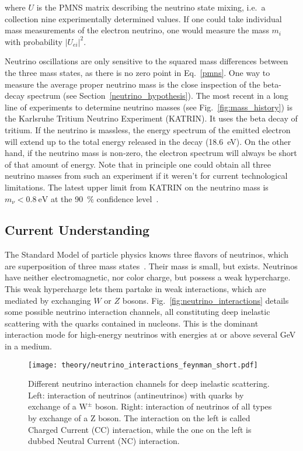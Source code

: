 where $U$ is the PMNS matrix describing the neutrino state mixing, i.e.\ a collection nine experimentally determined values. If one could take individual mass measurements of the electron neutrino, one would measure the mass $m_i$ with probability $|U_{ei}|^2$.

Neutrino oscillations are only sensitive to the squared mass differences between the three mass states, as there is no zero point in Eq.~\ref{pmns}. One way to measure the average proper neutrino mass is the close inspection of the beta-decay spectrum (see Section~\ref{neutrino_hypothesis}). The most recent in a long line of experiments to determine neutrino masses (see Fig.~\ref{fig:mass_history}) is the Karlsruhe Tritium Neutrino Experiment (KATRIN). It uses the beta decay of tritium. If the neutrino is massless, the energy spectrum of the emitted electron will extend up to the total energy released in the decay (\SI{18.6}{\eV}). On the other hand, if the neutrino mass is non-zero, the electron spectrum will always be short of that amount of energy. Note that in principle one could obtain all three neutrino masses from such an experiment if it weren't for current technological limitations. The latest upper limit from KATRIN on the neutrino mass is $m_\nu < \SI{0.8}{\eV}$ at the \SI{90}{\percent} confidence level~.


\subsection{Current Understanding}\label{neutrinos_current}
The Standard Model of particle physics knows three flavors of neutrinos, which are superposition of three mass states~. Their mass is small, but exists. Neutrinos have neither electromagnetic, nor color charge, but possess a weak hypercharge. This weak hypercharge lets them partake in weak interactions, which are mediated by exchanging $W$ or $Z$ bosons. Fig.~\ref{fig:neutrino_interactions} details some possible neutrino interaction channels, all constituting deep inelastic scattering with the quarks contained in nucleons. This is the dominant interaction mode for high-energy neutrinos with energies at or above several \unit{\giga\eV} in a medium.

\begin{figure}[htb]
    \texttt{[image: theory/neutrino\_interactions\_feynman\_short.pdf]}
    \caption[Neutrino interactions]{Different neutrino interaction channels for deep inelastic scattering. Left: interaction of neutrinos (antineutrinos) with quarks by exchange of a $\text{W}^{\pm}$ boson. Right: interaction of neutrinos of all types by exchange of a Z boson. The interaction on the left is called Charged Current (CC) interaction, while the one on the left is dubbed Neutral Current (NC) interaction.}
\end{figure}

